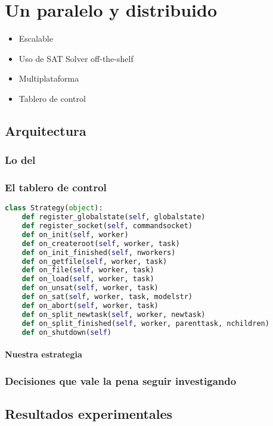\chapter{Un \ssolver paralelo y distribuido }
\label{ssolver-pardist}

\begin{itemize}
	\item Escalable
	\item Uso de SAT Solver off-the-shelf
	\item Multiplataforma
	\item Tablero de control
\end{itemize}

\section{Arquitectura}

\subsection{Lo del \cluster}

\subsection{El tablero de control}


\begin{small}
\begin{lstlisting}[language=Python,caption=Interfaz Strategy]
class Strategy(object):
	def register_globalstate(self, globalstate)
	def register_socket(self, commandsocket)
	def on_init(self, worker)
	def on_createroot(self, worker, task)
	def on_init_finished(self, nworkers)
	def on_getfile(self, worker, task)
	def on_file(self, worker, task)
	def on_load(self, worker, task)
	def on_unsat(self, worker, task)
	def on_sat(self, worker, task, modelstr)
	def on_abort(self, worker, task)
	def on_split_newtask(self, worker, newtask)
	def on_split_finished(self, worker, parenttask, nchildren)
	def on_shutdown(self)
\end{lstlisting}
\end{small}

\subsubsection{Nuestra estrategia}

\subsection{Decisiones que vale la pena seguir investigando}

\section{Resultados experimentales}
